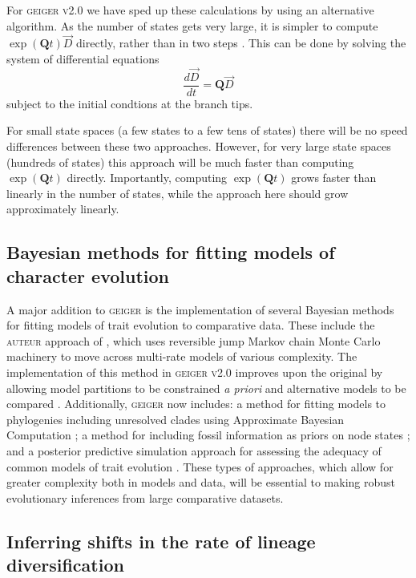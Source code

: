 For \textsc{geiger v2.0} we have sped up these calculations by using an alternative algorithm.
As the number of states gets very large, it is simpler to compute
$\exp(\mathbf{Q}t) \vec D$ directly, rather than in two steps
\citep{Sidje-1998-130}.  This can be done by solving the system of
differential equations
\begin{equation}
\frac{d \vec D}{dt} = \mathbf{Q} \vec D
\end{equation}
subject to the initial condtions at the branch tips.

For small state spaces (a few states to a few tens of states) there
will be no speed differences between these two approaches.  However,
for very large state spaces (hundreds of states) this approach will be
much faster than computing $\exp(\mathbf{Q} t)$ directly.
Importantly, computing $\exp(\mathbf{Q} t)$ grows faster than linearly
in the number of states, while the approach here should grow
approximately linearly.


\subsection{Bayesian methods for fitting models of character evolution}

A major addition to \textsc{geiger} is the implementation of several Bayesian methods for fitting models of trait evolution to comparative data. These include the \textsc{auteur} approach of \citet{Eastman2011}, which uses reversible jump Markov chain Monte Carlo machinery \citep{Green1995} to move across multi-rate  models of various complexity. The implementation of this method in \textsc{geiger v2.0} improves upon the original by allowing model partitions to be constrained \emph{a priori} and alternative models to be compared \citep{Eastmanlevy}. Additionally, \textsc{geiger} now includes: a method for fitting models to phylogenies including unresolved clades using Approximate Bayesian Computation \citep[\textsc{mecca};][]{Slater2012MECCA}; a method for including fossil information as priors on node states \citep{Slater2012Fossil}; and a posterior predictive simulation approach for assessing the adequacy of common models of trait evolution \citep{SlaterPennell}. These types of approaches, which allow for greater complexity both in models and data, will be essential to making robust evolutionary inferences from large comparative datasets.  


\subsection{Inferring shifts in the rate of lineage diversification}

